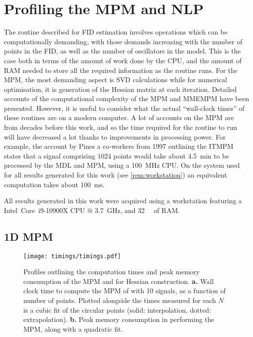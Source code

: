 \section{Profiling the \acs{MPM} and \acs{NLP}}
\label{sec:profiling}
The routine described for \ac{FID} estimation involves operations which can be
computationally demanding, with those demands increasing with the number of
points in the \ac{FID}, as well as the number of oscillators in the model. This
is the case both in terms of the amount of work
done by the \ac{CPU}, and the amount of \ac{RAM} needed to store all the
required information as the routine runs. For the \ac{MPM}, the most
demanding aspect is \ac{SVD} calculations while for numerical optimisation, it
is generation of the Hessian matrix at each iteration. Detailed accounts of the
computational complexity of the \ac{MPM} and \ac{MMEMPM} have been
presented\cite{Hua1992,Chen2007}.  However, it is useful to consider what the
actual ``wall-clock times'' of these routines are on a modern computer. A lot of
accounts on the \ac{MPM} are from decades before this work, and so the
time required for the routine to run will have decreased a lot thanks to
improvements in processing power. For example, the account by Pines a co-workers
from 1997 outlining the \ac{ITMPM} states that a signal comprising $1024$
points would take about
\qty{4.5}{\minute} to be processed by the \ac{MDL} and \ac{MPM}, using a
\qty{100}{\mega\hertz} \ac{CPU}\cite{Lin1997}. On the system used for all
results generated for this work (see \cref{rem:workstation}) an
equivalent computation takes about \qty{100}{\milli\second}.
\begin{remark}
    \label{rem:workstation}
    All results generated in this work were acquired using a workstation
    featuring a Intel\textregistered\ Core\texttrademark\ i9-10900X CPU @
    \qty{3.7}{\giga\hertz}, and \qty{32}{\gibi\byte} of RAM.
\end{remark}

\subsection{\acs{1D} \acs{MPM}}
\begin{figure}
    \texttt{[image: timings/timings.pdf]}
    \caption[
        Profiles outlining the computation times and peak memory consumption of
        the \acs{MPM} and for Hessian construction.
    ]
    {
        Profiles outlining the computation times and peak memory consumption of
        the \acs{MPM} and for Hessian construction.
        \textbf{a.} Wall clock time to compute the \ac{MPM} of 
        with 10 signals, as a function of number of points. Plotted alongside
        the times measured for each $N$ is a cubic fit of the circular points
        (solid: interpolation, dotted: extrapolation).
        \textbf{b.} Peak memory consumption in performing the \ac{MPM}, along
        with a quadratic fit.
    }
    \label{fig:profiling}
\end{figure}

